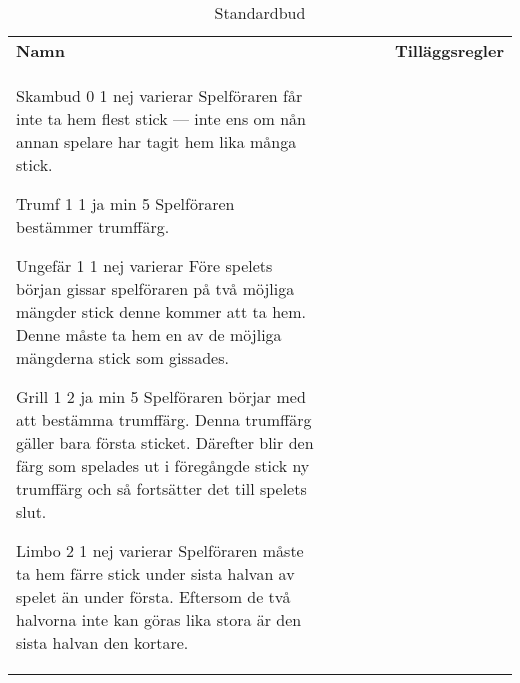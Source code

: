 %
%
%
%
%

\begin{table}
	\caption{Standardbud}\label{tab:standardBids}
	\begin{center}
		\begin{tabularx}{\textwidth}{
			l
			S[table-number-alignment=center, table-format=1.0]
			S[table-number-alignment=center, table-format=1.0]
			cc|X
		}
				\textbf{Namn} &
				 &
				 &
				 &
				 &
				\textbf{Tilläggsregler}
				\\[-3ex]

				\standardBidItem%
				{Skambud}
				{0}
				{1}
				{nej}
				{varierar}
				{%
					Spelföraren får inte ta hem flest stick --- inte ens om nån annan spelare har tagit hem lika många stick.
				}

				\standardBidItem%
				{Trumf}
				{1}
				{1}
				{ja}
				{min 5}
				{%
					Spelföraren bestämmer trumffärg.
				}

				\standardBidItem%
				{Ungefär}
				{1}
				{1}
				{nej}
				{varierar}
				{%
					Före spelets början gissar spelföraren på två möjliga mängder stick denne kommer att ta hem. Denne måste ta hem en av de möjliga mängderna stick som gissades.
				}

				\standardBidItem%
				{Grill}
				{1}
				{2}
				{ja}
				{min 5}
				{%
					Spelföraren börjar med att bestämma trumffärg. Denna trumffärg gäller bara första sticket. Därefter blir den färg som spelades ut i föregångde stick ny trumffärg och så fortsätter det till spelets slut.
				}

				\standardBidItem%
				{Limbo}
				{2}
				{1}
				{nej}
				{varierar}
				{%
					Spelföraren måste ta hem färre stick under sista halvan av spelet än under första. Eftersom de två halvorna inte kan göras lika stora är den sista halvan den kortare.
				}
				

\end{tabularx}
\end{center}
\end{table}
